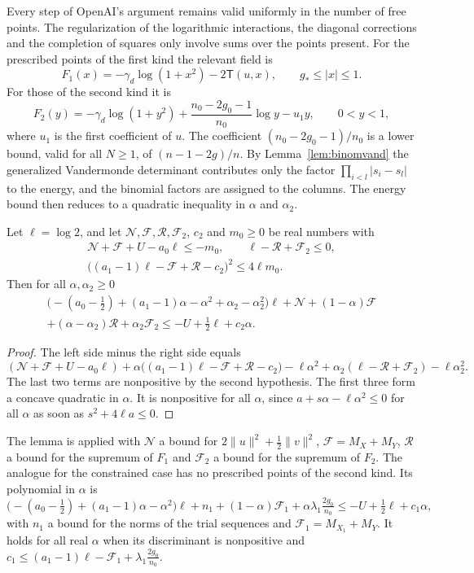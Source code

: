 Every step of OpenAI's argument remains valid uniformly in the number of free points. The regularization of
the logarithmic interactions, the diagonal corrections and the completion of squares only involve sums over
the points present. For the prescribed points of the first kind the relevant field is
\[
 F_1(x)=-\gamma_d\log(1+x^2)-2\mathsf T(u,x),\qquad g_*\le|x|\le1 .
\]
For those of the second kind it is
\[
 F_2(y)=-\gamma_d\log(1+y^2)+\frac{n_0-2g_0-1}{n_0}\log y-u_1y,\qquad0<y<1,
\]
where $u_1$ is the first coefficient of $u$. The coefficient $(n_0-2g_0-1)/n_0$ is a lower bound, valid for all
$N\ge1$, of $(n-1-2g)/n$. By Lemma~\ref{lem:binomvand} the generalized Vandermonde determinant contributes only
the factor $\prod_{i<l}|s_i-s_l|$ to the energy, and the binomial factors are assigned to the columns. The
energy bound then reduces to a quadratic inequality in $\alpha$ and $\alpha_2$.

\begin{lemma}\label{lem:energy-ineq}
Let $\ell=\log2$, and let $\mathcal N,\mathcal F,\mathcal R,\mathcal F_2$, $c_2$ and $m_0\ge0$ be real numbers
with
\begin{gather*}
 \mathcal N+\mathcal F+U-a_0\ell\le-m_0,\qquad \ell-\mathcal R+\mathcal F_2\le0,\\
 \bigl((a_1-1)\ell-\mathcal F+\mathcal R-c_2\bigr)^2\le4\ell m_0 .
\end{gather*}
Then for all $\alpha,\alpha_2\ge0$
\begin{multline*}
 \bigl(-(a_0-\tfrac12)+(a_1-1)\alpha-\alpha^2+\alpha_2-\alpha_2^2\bigr)\ell+\mathcal N+(1-\alpha)\mathcal F\\
 +(\alpha-\alpha_2)\mathcal R+\alpha_2\mathcal F_2\le-U+\tfrac12\ell+c_2\alpha .
\end{multline*}
\end{lemma}

\begin{proof}
The left side minus the right side equals
\[
 (\mathcal N+\mathcal F+U-a_0\ell)+\alpha\bigl((a_1-1)\ell-\mathcal F+\mathcal R-c_2\bigr)-\ell\alpha^2
 +\alpha_2(\ell-\mathcal R+\mathcal F_2)-\ell\alpha_2^2 .
\]
The last two terms are nonpositive by the second hypothesis. The first three form a concave quadratic in
$\alpha$. It is nonpositive for all $\alpha$, since $a+s\alpha-\ell\alpha^2\le0$ for all $\alpha$ as soon as
$s^2+4\ell a\le0$.
\end{proof}

The lemma is applied with $\mathcal N$ a bound for $2\|u\|^2+\frac12\|v\|^2$, $\mathcal F=M_X+M_Y$,
$\mathcal R$ a bound for the supremum of $F_1$ and $\mathcal F_2$ a bound for the supremum of $F_2$. The
analogue for the constrained case has no prescribed points of the second kind. Its polynomial in $\alpha$ is
\[
 \bigl(-(a_0-\tfrac12)+(a_1-1)\alpha-\alpha^2\bigr)\ell+n_1+(1-\alpha)\mathcal F_1+\alpha\lambda_1\tfrac{2g_0}{n_0}
 \le-U+\tfrac12\ell+c_1\alpha,
\]
with $n_1$ a bound for the norms of the trial sequences and $\mathcal F_1=M_{X_1}+M_Y$. It holds for all real
$\alpha$ when its discriminant is nonpositive and $c_1\le(a_1-1)\ell-\mathcal F_1+\lambda_1\tfrac{2g_0}{n_0}$.

